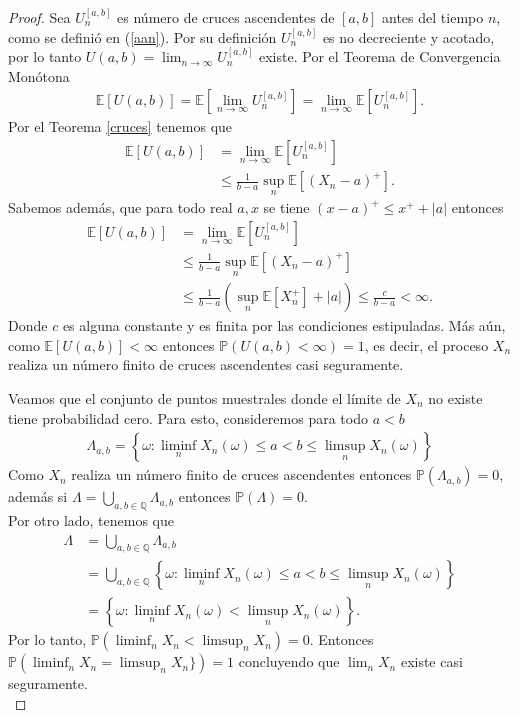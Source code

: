 \begin{proof}
Sea $U_n^{[a, b]}$ es número de cruces ascendentes de $[a, b]$ antes del tiempo $n$, como se definió en (\ref{aan}). Por su definición $U_n^{[a, b]}$ es no decreciente y acotado, por lo tanto $U(a, b) = \lim_{n \rightarrow \infty} U_n^{[a, b]}$ existe. Por el Teorema de Convergencia Monótona
	\begin{align*}
	\mathbb{E}[U(a, b)] = \mathbb{E}\left[\lim_{n \rightarrow \infty} U_n^{[a, b]}\right] = \lim_{n \rightarrow \infty} \mathbb{E}[U_n^{[a, b]}].
	\end{align*}
Por el Teorema \ref{cruces} tenemos que 
	\begin{align*}
	\mathbb{E}[U(a, b)] & = \lim_{n \rightarrow \infty} \mathbb{E}[U_n^{[a, b]}] \\
	& \leq \frac{1}{b - a} \sup_n \mathbb{E}[(X_n - a)^{+}].
	\end{align*}
Sabemos además, que para todo real $a, x$ se tiene $(x-a)^{+} \leq x^{+} + |a|$ entonces
	\begin{align*}
	\mathbb{E}[U(a, b)] & = \lim_{n \rightarrow \infty} \mathbb{E}[U_n^{[a, b]}] \\
	& \leq \frac{1}{b - a} \sup_n \mathbb{E}[(X_n - a)^{+}] \\
	& \leq \frac{1}{b - a} \left( \sup_n \mathbb{E}[X_n^{+}] + |a| \right) \leq \frac{c}{b-a} < \infty.
	\end{align*}
Donde $c$ es alguna constante y es finita por las condiciones estipuladas. Más aún, como $\mathbb{E}[U(a, b)] < \infty$ entonces $\mathbb{P}(U(a, b) < \infty) = 1$, es decir, el proceso $X_n$ realiza un número finito de cruces ascendentes casi seguramente.

Veamos que el conjunto de puntos muestrales donde el límite de $X_n$ no existe tiene probabilidad cero. Para esto, consideremos para todo $a < b$
	\begin{align*}
	\Lambda_{a, b} = \left\{ \omega : \liminf_n X_n(\omega) \leq a < b \leq  \limsup_n X_n(\omega) \right\}
	\end{align*}
Como $X_n$ realiza un número finito de cruces ascendentes entonces $\mathbb{P}(\Lambda_{a, b}) = 0$, además si $\Lambda = \bigcup_{a, b \in \mathbb{Q}} \Lambda_{a, b}$ entonces $\mathbb{P}(\Lambda) = 0$. \\

Por otro lado, tenemos que 
	\begin{align*}
	\Lambda & = \bigcup_{{a, b} \in \mathbb{Q}} \Lambda_{a, b} \\
	& = \bigcup_{{a, b} \in \mathbb{Q}} \left\{ \omega : \liminf_n X_n(\omega) \leq a < b \leq  \limsup_n X_n(\omega) \right\} \\
	& = \left\{ \omega : \liminf_n X_n(\omega) < \limsup_n X_n(\omega) \right\}.
	\end{align*}
Por lo tanto, $\mathbb{P}(\liminf_n X_n < \limsup_n X_n ) = 0$. Entonces $\mathbb{P}(\liminf_n X_n = \limsup_n X_n \}) = 1$ concluyendo que $\lim_n X_n$ existe casi seguramente. \\


\end{proof}
